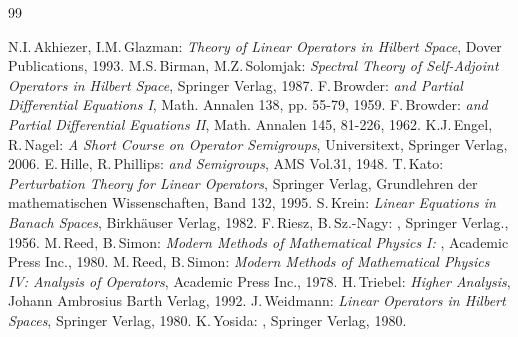 \documentclass[11pt,twoside]{article}
\begin{document}
\newpage
\thispagestyle{empty}
\begin{thebibliography}{99}
\begin{small}
  N.I.\,Akhiezer, I.M.\,Glazman: \textit{Theory of Linear Operators in Hilbert Space}, Dover Publications, 1993.
  M.S.\,Birman, M.Z.\,Solomjak:  \textit{Spectral Theory of Self-Adjoint Operators in Hilbert Space}, Springer Verlag, 1987.
 F.\,Browder:                   \textit{{\FA} and Partial Differential Equations I}, Math. Annalen 138, pp. 55-79, 1959.
 F.\,Browder:                   \textit{{\FA} and Partial Differential Equations II}, Math. Annalen 145, 81-226, 1962.
  K.J.\,Engel, R.\,Nagel:        \textit{A Short Course on Operator Semigroups}, Universitext, Springer Verlag, 2006.
  E.\,Hille, R.\,Phillips:       \textit{{\FA} and Semigroups}, AMS Vol.31, 1948.
  T.\,Kato:                      \textit{Perturbation Theory for Linear Operators}, Springer Verlag, Grundlehren der mathematischen Wissenschaften, Band 132, 1995.
  S.\,Krein: \textit{Linear Equations in Banach Spaces}, Birkh\"{a}user Verlag, 1982.
  F.\,Riesz, B.\,Sz.-Nagy:       \textit{{\FA}}, Springer Verlag., 1956.
 M.\,Reed, B.\,Simon:           \textit{Modern Methods of Mathematical Physics I: {\FA}}, Academic Press Inc., 1980.
 M.\,Reed, B.\,Simon:           \textit{Modern Methods of Mathematical Physics IV: Analysis of Operators}, Academic Press Inc., 1978.
  H.\,Triebel:                   \textit{Higher Analysis}, Johann Ambrosius Barth Verlag, 1992.
  J.\,Weidmann:                  \textit{Linear Operators in Hilbert Spaces}, Springer Verlag, 1980.
  K.\,Yosida:                    \textit{{\FA}}, Springer Verlag, 1980.
\end{small}
\end{thebibliography}

\end{document}
